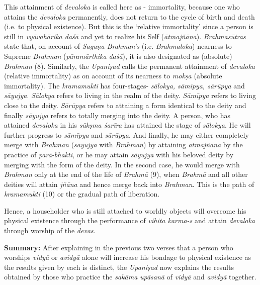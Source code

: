 This attainment of \emph{devaloka} is called here as - immortality, because one who attains the \emph{devaloka} permanently, does not return to the cycle of birth and death (i.e. to physical existence). But this is the `relative immortality' since a person is still in \emph{vyāvahārika daśā} and yet to realize his Self (\emph{ātmajñāna}). \emph{Brahmasūtras} state that, on account of \emph{Saguṇa Brahman's} (i.e. \emph{Brahmaloka}) nearness to Supreme \emph{Brahman} (\emph{pāramārthika} \emph{daśā}), it is also designated as (absolute) \emph{Brahman} (8). Similarly, the \emph{Upaniṣad} calls the permanent attainment of \emph{devaloka} (relative immortality) as  on account of its nearness to \emph{mokṣa} (absolute immortality). The \emph{kramamukti} has four-stages- \emph{sālokya, sāmipya, sārūpya} and \emph{sāyujya}. \emph{Sālokya} refers to living in the realm of the deity. \emph{Sāmīpya} refers to living close to the deity. \emph{Sārūpya} refers to attaining a form identical to the deity and finally \emph{sāyujya} refers to totally merging into the deity. A person, who has attained \emph{devaloka} in his \emph{sūkṣma śarīra} has attained the stage of \emph{sālokya}. He will further progress to \emph{sāmīpya} and \emph{sārūpya}. And finally, he may either completely merge with \emph{Brahman} (\emph{sāyujya} with \emph{Brahman}) by attaining \emph{ātmajñāna} by the practice of \emph{parā-bhakti}, or he may attain \emph{sāyujya} with his beloved deity by merging with the form of the deity. In the second case, he would merge with \emph{Brahman} only at the end of the life of \emph{Brahmā} (9), when \emph{Brahmā} and all other deities will attain \emph{jñāna} and hence merge back into \emph{Brahman}. This is the path of \emph{kramamukti} (10) or the gradual path of liberation.

Hence, a householder who is still attached to worldly objects will overcome his physical existence through the performance of \emph{vihita karma-s} and attain \emph{devaloka} through worship of the \emph{devas}.

\textbf{Summary:} After explaining in the previous two verses that a person who worships \emph{vidyā} or \emph{avidyā} alone will increase his bondage to physical existence as the results given by each is distinct, the \emph{Upaniṣad} now explains the results obtained by those who practice the \emph{sakāma} \emph{upāsanā} of \emph{vidyā} and \emph{avidyā} together.

